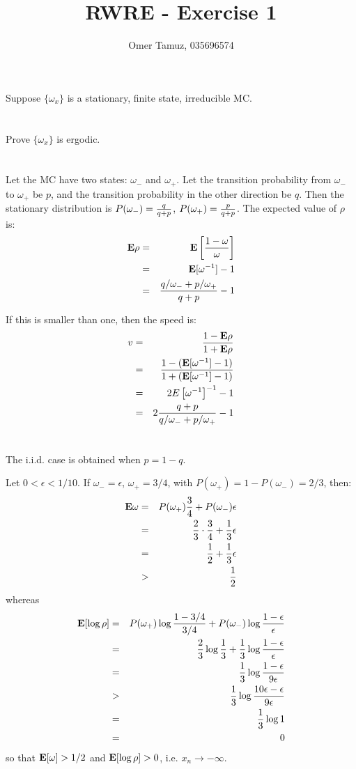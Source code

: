 \documentclass[11pt]{article} \usepackage{amssymb}
\newcommand{\E}{{\bf E}} \newcommand{\Cov}{{\bf Cov}}
\begin{document}
\title{RWRE - Exercise 1}

 \author{Omer Tamuz, 035696574}
\maketitle

Suppose $\{\omega_x\}$ is a stationary, finite state, irreducible MC.
\section{}
Prove  $\{\omega_x\}$ is ergodic.
\section{}
Let the MC have two states: $\omega_-$ and $\omega_+$. Let the transition
probability from $\omega_-$ to $\omega_+$ be $p$, and the transition
probability in the other direction be $q$. Then the stationary distribution
is $P(\omega_-)={q\over q+p}$, $P(\omega_+)={p\over q+p}$. 
The expected value of $\rho$ is:
\begin{eqnarray*}
  \E\rho
    &=& \E\left[{1-\omega\over \omega}\right]\\
    &=& \E[\omega^{-1}]-1\\
    &=& {q/\omega_-+p/\omega_+\over q+p}-1
\end{eqnarray*}

If this is smaller than one, then the speed is:
\begin{eqnarray*}
  v &=& {1-\E\rho \over 1+\E\rho}\\
    &=& {1-(\E[\omega^{-1}]-1) \over 1+(\E[\omega^{-1}]-1)}\\
    &=& 2E\left[\omega^{-1}\right]^{-1}-1\\
    &=& 2{q+p \over q/\omega_-+p/\omega_+}-1
\end{eqnarray*}
\section{}
The i.i.d. case is obtained when $p=1-q$. 

Let $0<\epsilon <1/10$.
If $\omega_-=\epsilon$, $\omega_+=3/4$, with $P(\omega_+)=1-P(\omega_-)=2/3$, then:
\begin{eqnarray*}
  \E\omega&=&P(\omega_+){3\over 4}+P(\omega_-)\epsilon\\
  &=&{2\over 3}\cdot{3\over 4}+{1\over 3}\epsilon\\
  &=&{1\over 2}+{1\over 3}\epsilon\\
  &>&{1\over 2}
\end{eqnarray*}
whereas 
\begin{eqnarray*}
  \E[\log\rho]&=&P(\omega_+)\log{1-3/4\over 3/4}+P(\omega_-)\log{1-\epsilon\over \epsilon}\\
  &=&{2\over 3}\log{1\over 3}+{1\over 3}\log{1-\epsilon\over \epsilon}\\
  &=&{1\over 3}\log{1-\epsilon\over 9\epsilon}\\
  &>&{1\over 3}\log{10\epsilon-\epsilon\over 9\epsilon}\\
  &=&{1\over 3}\log{1}\\
  &=&0
\end{eqnarray*} 
so that $\E[\omega]>1/2$ and $\E[\log\rho]>0$, i.e. $x_n\to-\infty$. 
\end{document}
